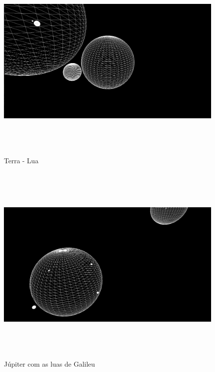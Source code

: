 \documentclass[11pt,a4paper]{report}
\begin{document}
\begin{figure}[H]
\centering
\includegraphics[width = 18cm,height = 10cm]{3.png}
\caption{Terra - Lua}
\label{fig:demo3}
\end{figure}

\begin{figure}[H]
\centering
\includegraphics[width = 18cm,height = 10cm]{4.png}
\caption{Júpiter com as luas de Galileu}
\label{fig:demo4}
\end{figure}
\end{document}
